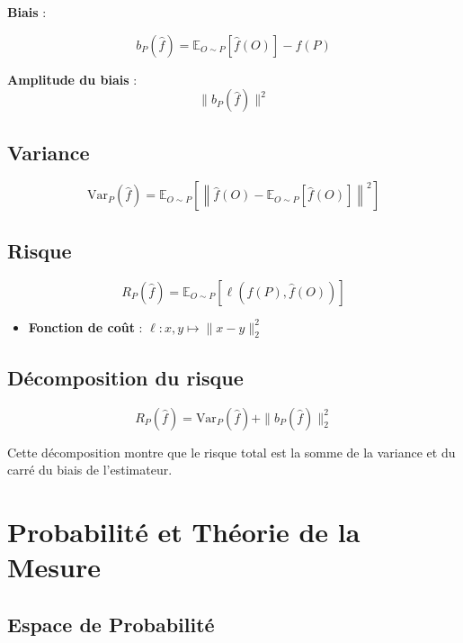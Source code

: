 \documentclass{article}
\begin{document}
\textbf{Biais} :

\[
b_P(\hat{f}) = \mathbb{E}_{O \sim P}[\hat{f}(O)] - f(P)
\]

\textbf{Amplitude du biais} : 
\[
\| b_P(\hat{f}) \|^2
\]


\subsection{Variance}

\[
\text{Var}_P(\hat{f}) = \mathbb{E}_{O \sim P} \left[ \left\| \hat{f}(O) - \mathbb{E}_{O \sim P}[\hat{f}(O)] \right\|^2 \right]
\]

\subsection{Risque}

\[
R_P(\hat{f}) = \mathbb{E}_{O \sim P} [ \ell(f(P), \hat{f}(O)) ]
\]

\begin{itemize}
    \item \textbf{Fonction de coût} : $\ell : x, y \mapsto \| x - y \|_2^2$
\end{itemize}

\subsection{Décomposition du risque}

\[
R_P(\hat{f}) = \text{Var}_P(\hat{f}) + \| b_P(\hat{f}) \|_2^2
\]

Cette décomposition montre que le risque total est la somme de la variance et du carré du biais de l'estimateur.

\section{Probabilité et Théorie de la Mesure}

\subsection{Espace de Probabilité}
\end{document}
